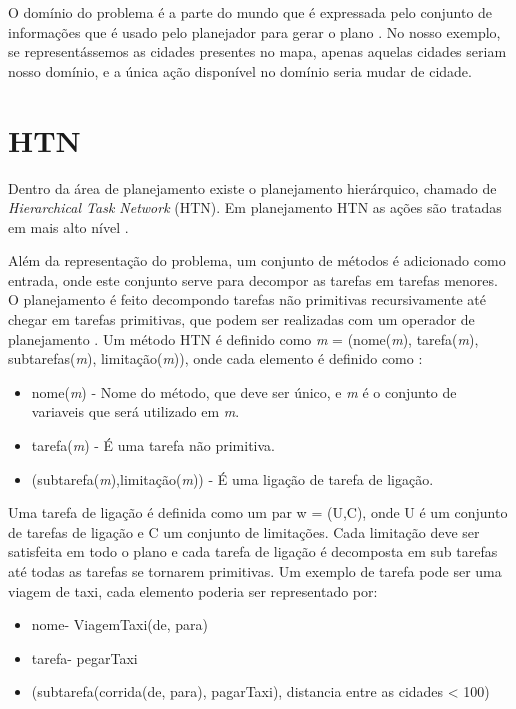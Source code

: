 O domínio do problema é a parte do mundo que é expressada pelo conjunto de informações que é usado pelo planejador para gerar o plano \cite{intelligence2003modern}. No nosso exemplo, se representássemos as cidades presentes no mapa, apenas aquelas cidades seriam nosso domínio, e a única ação disponível no domínio seria mudar de cidade.


\section{HTN} 

Dentro da área de planejamento existe o planejamento hierárquico, chamado de \textit{Hierarchical Task Network} (HTN). Em planejamento HTN as ações são tratadas em mais alto nível \cite{intelligence2003modern}. 

Além da representação do problema, um conjunto de métodos é adicionado como entrada, onde este conjunto serve para decompor as tarefas em tarefas menores. O planejamento é feito decompondo tarefas não primitivas recursivamente até chegar em tarefas primitivas, que podem ser realizadas com um operador de planejamento \cite{ghallab2004automated}. Um método HTN é definido como \textit{m} = (nome(\textit{m}), tarefa(\textit{m}), subtarefas(\textit{m}), limitação(\textit{m})), onde cada elemento é definido como \cite{ghallab2004automated}: 

\begin{itemize}
	\item nome(\textit{m}) - Nome do método, que deve ser único, e \textit{m} é o conjunto de variaveis que será utilizado em \textit{m}. 
	\item tarefa(\textit{m}) - É uma tarefa não primitiva.
	\item (subtarefa(\textit{m}),limitação(\textit{m})) - É uma ligação de tarefa de ligação.
\end{itemize}

Uma tarefa de ligação é definida como um par w = (U,C), onde U é um conjunto de tarefas de ligação e C um conjunto de limitações. Cada limitação deve ser satisfeita em todo o plano e cada tarefa de ligação é decomposta em sub tarefas até todas as tarefas se tornarem primitivas. 
Um exemplo de tarefa pode ser uma viagem de taxi, cada elemento poderia ser representado por:

\begin{itemize}
	\item nome- ViagemTaxi(de, para)
	\item tarefa- pegarTaxi
	\item (subtarefa({corrida(de, para), pagarTaxi}), distancia entre as cidades < 100) 
\end{itemize}

